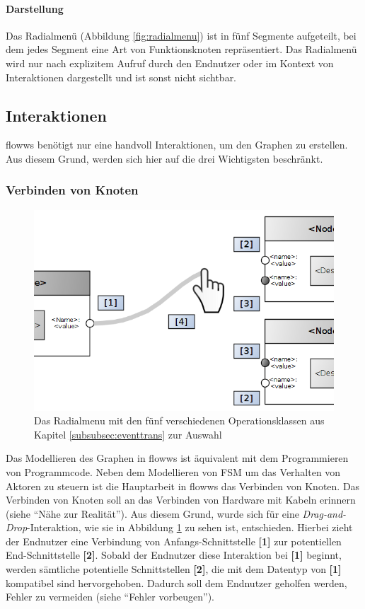 \paragraph{Darstellung} Das Radialmenü (Abbildung \ref{fig:radialmenu}) ist in fünf Segmente aufgeteilt, bei dem jedes Segment eine Art von Funktionsknoten repräsentiert. Das Radialmenü wird nur nach explizitem Aufruf durch den Endnutzer oder im Kontext von Interaktionen dargestellt und ist sonst nicht sichtbar. 

\subsection{Interaktionen}

flowws benötigt nur eine handvoll Interaktionen, um den Graphen zu erstellen. Aus diesem Grund, werden sich hier auf die drei Wichtigsten beschränkt.

\subsubsection{Verbinden von Knoten}

\begin{figure}[h]
  \centering
  \includegraphics[width=.75\textwidth]{bilder/chapter4/chapter4_3/connectNodes.png}
  \caption{Das Radialmenu mit den fünf verschiedenen Operationsklassen aus Kapitel \ref{subsubsec:eventtrans} zur Auswahl}
  \label{fig:connectNodesInteraction}
\end{figure}
Das Modellieren des Graphen in flowws ist äquivalent mit dem Programmieren von Programmcode. Neben dem Modellieren von \ac{FSM} um das Verhalten von Aktoren zu steuern ist die Hauptarbeit in flowws das Verbinden von Knoten. Das Verbinden von Knoten soll an das Verbinden von Hardware mit Kabeln erinnern (siehe "`Nähe zur Realität"'). Aus diesem Grund, wurde sich für eine \textit{Drag-and-Drop}-Interaktion, wie sie in Abbildung \ref{fig:connectNodesInteraction} zu sehen ist, entschieden. Hierbei zieht der Endnutzer eine Verbindung von Anfangs-Schnittstelle \textbf{[1]} zur potentiellen End-Schnittstelle \textbf{[2]}. Sobald der Endnutzer diese Interaktion bei \textbf{[1]} beginnt, werden sämtliche potentielle Schnittstellen \textbf{[2]}, die mit dem Datentyp von \textbf{[1]} kompatibel sind hervorgehoben. Dadurch soll dem Endnutzer geholfen werden, Fehler zu vermeiden (siehe "`Fehler vorbeugen"').

